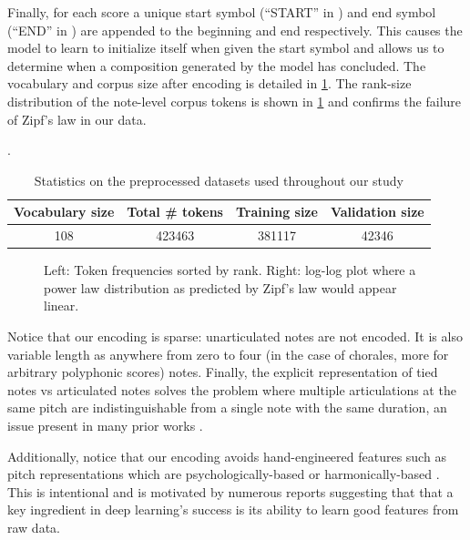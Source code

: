 Finally, for each score a unique start symbol (``START'' in )
and end symbol (``END'' in ) are appended to the beginning and
end respectively. This causes the model to learn to initialize itself when
given the start symbol and allows us to determine when a composition generated
by the model has concluded. The vocabulary and corpus size after encoding is
detailed in \cref{tab:encoded-corpus-stats}. The rank-size distribution of the
note-level corpus tokens is shown in \cref{fig:zipf} and confirms the failure
of Zipf's law in our data.

\begin{table}[tb]
  \centering
  \caption{Statistics on the preprocessed datasets used throughout our study}
  \label{tab:encoded-corpus-stats}.
  \begin{tabular}{c c c c}
    \toprule
    Vocabulary size & Total \# tokens & Training size & Validation size \\
    \midrule
    108 & 423463 & 381117 & 42346 \\
    \bottomrule
  \end{tabular}
\end{table}

\begin{figure}[tb]
  \centering
  
  \caption{Left: Token frequencies sorted by rank. Right: log-log plot where
  a power law distribution as predicted by Zipf's law would appear linear.}
  \label{fig:zipf}
\end{figure}

Notice that our encoding is sparse: unarticulated notes are not encoded. It is
also variable length as anywhere from zero to four (in the case of chorales,
more for arbitrary polyphonic scores) notes. Finally, the explicit
representation of tied notes vs articulated notes solves the problem where
multiple articulations at the same pitch are indistinguishable from a single
note with the same duration, an issue present in many prior works
\citep{Eck2002,eck2008learning,Liu2014,Brien2016}.

Additionally, notice that our encoding avoids hand-engineered features such as
pitch representations which are psychologically-based \citep{mozer1994neural}
or harmonically-based \citep{franklin2004recurrent}
\citep{laden1989representation}. This is intentional and is motivated by
numerous reports \citep{bengio2009learning}\citep{Bengio2011} suggesting that
that a key ingredient in deep learning's success is its ability to learn good
features from raw data.


